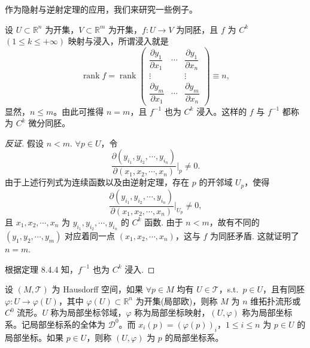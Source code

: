 \noindent 作为隐射与逆射定理的应用，我们来研究一些例子。

\begin{example}\label{ex:8.4.3}
设 $U \subset \mathbb{R}^{n}$ 为开集，$V \subset \mathbb{R}^{m}$ 为开集，$f: U \to V$ 为同胚，且 $f$ 为 $C^{k}$ $(1 \leqslant k \leqslant +\infty)$ 映射与浸入，所谓浸入就是
\[
  \operatorname{rank} f = \operatorname{rank}\begin{pmatrix}
    \dfrac{\partial y_{1}}{\partial x_{1}} & \cdots & \dfrac{\partial y_{1}}{\partial x_{n}} \\
    \vdots & & \vdots \\
    \dfrac{\partial y_{m}}{\partial x_{1}} & \cdots & \dfrac{\partial y_{m}}{\partial x_{n}}
  \end{pmatrix} \equiv n,
\]
显然，$n \leqslant m$。由此可推得 $n = m$，且 $f^{-1}$ 也为 $C^{k}$ 浸入。这样的 $f$ 与 $f^{-1}$ 都称为 $C^{k}$ 微分同胚。
\end{example}

\begin{proof}[反证]
假设 $n < m$. $\forall p \in U$，令
\[
  \frac{\partial(y_{i_{1}},y_{i_{2}},\cdots,y_{i_{n}})}{\partial(x_{1},x_{2},\cdots,x_{n})}\bigg|_{p} \neq 0.
\]
由于上述行列式为连续函数以及由逆射定理，存在 $p$ 的开邻域 $U_{p}$，使得
\[
  \frac{\partial(y_{i_{1}},y_{i_{2}},\cdots,y_{i_{n}})}{\partial(x_{1},x_{2},\cdots,x_{n})}\bigg|_{U_{p}} \neq 0,
\]
且 $x_{1},x_{2},\cdots,x_{n}$ 为 $y_{i_{1}},y_{i_{2}},\cdots,y_{i_{n}}$ 的 $C^{k}$ 函数. 由于 $n < m$，故有不同的 $(y_{1},y_{2},\cdots,y_{m})$ 对应着同一点 $(x_{1},x_{2},\cdots,x_{n})$，这与 $f$ 为同胚矛盾. 这就证明了 $n = m$.

根据定理 8.4.4 知，$f^{-1}$ 也为 $C^{k}$ 浸入.
\end{proof}

\begin{definition}\label{def:8.4.1}
设 $(M,\mathcal{T})$ 为 Hausdorff 空间，如果 $\forall p \in M$ 均有 $U \in \mathcal{T}$，s.t.\ $p \in U$，且有同胚 $\varphi: U \to \varphi(U)$，其中 $\varphi(U) \subset \mathbb{R}^{n}$ 为开集(局部欧)，则称 $M$ 为 $n$ 维拓扑流形或 $C^{0}$ 流形。$U$ 称为局部坐标邻域，$\varphi$ 称为局部坐标映射，$(U,\varphi)$ 称为局部坐标系。记局部坐标系的全体为 $\mathcal{D}^{0}$。而 $x_{i}(p) = (\varphi(p))_{i}$，$1 \leqslant i \leqslant n$ 为 $p \in U$ 的局部坐标。如果 $p \in U$，则称 $(U,\varphi)$ 为 $p$ 的局部坐标系。
\end{definition}

